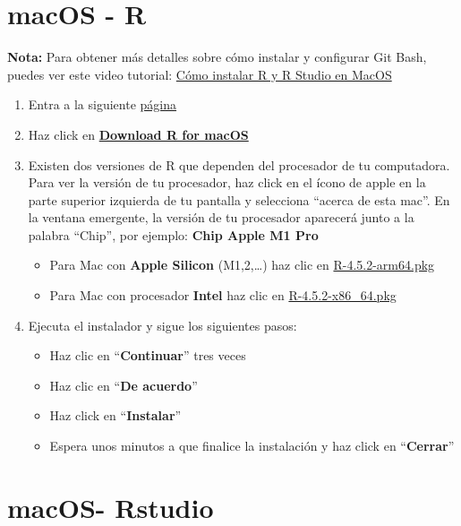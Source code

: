 \documentclass[
  spanish,
  12pt,
  letterpaper,
  DIV=11,
  numbers=noendperiod]{scrreprt}
\begin{document}
\section{macOS - R}\label{macos---r}

\textbf{Nota:} Para obtener más detalles sobre cómo instalar y
configurar Git Bash, puedes ver este video tutorial:
\href{https://www.youtube.com/watch?v=_k8seoE6b-E}{Cómo instalar R y R
Studio en MacOS}

\begin{enumerate}
\def\labelenumi{\arabic{enumi}.}
\item
  Entra a la siguiente \href{https://cloud.r-project.org/}{página}
\item
  Haz click en \ul{\textbf{Download R for macOS}}
\item
  Existen dos versiones de R que dependen del procesador de tu
  computadora. Para ver la versión de tu procesador, haz click en el
  ícono de apple en la parte superior izquierda de tu pantalla y
  selecciona ``acerca de esta mac''. En la ventana emergente, la versión
  de tu procesador aparecerá junto a la palabra ``Chip'', por ejemplo:
  \textbf{Chip Apple M1 Pro}

  \begin{itemize}
  \item
    Para Mac con \textbf{Apple Silicon} (M1,2,\ldots) haz clic en
    \ul{R-4.5.2-arm64.pkg}
  \item
    Para Mac con procesador \textbf{Intel} haz clic en
    \ul{R-4.5.2-x86\_64.pkg}
  \end{itemize}
\item
  Ejecuta el instalador y sigue los siguientes pasos:

  \begin{itemize}
  \item
    Haz clic en ``\textbf{Continuar}'' tres veces
  \item
    Haz clic en ``\textbf{De acuerdo}''
  \item
    Haz click en ``\textbf{Instalar}''
  \item
    Espera unos minutos a que finalice la instalación y haz click en
    ``\textbf{Cerrar}''
  \end{itemize}
\end{enumerate}

\section{macOS- Rstudio}\label{macos--rstudio}
\end{document}

